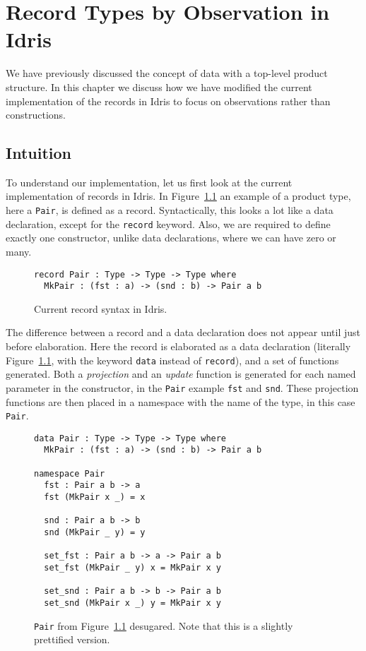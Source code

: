 \chapter{Record Types by Observation in Idris}
\label{cha:coind-records-idris}
We have previously discussed the concept of data with a top-level product
structure. In this chapter we discuss how we have modified the current
implementation of the records in Idris to focus on observations rather
than constructions.

\section{Intuition}
To understand our implementation, let us first look at the current
implementation of records in Idris. In Figure~\ref{fig:records_in_idris} an
example of a product type, here a \texttt{Pair}, is defined as a
record. Syntactically, this looks a lot like a data declaration, except for the
\texttt{record} keyword. Also, we are required to define exactly one
constructor, unlike data declarations, where we can have zero or many.

\begin{figure}[h]
\begin{lstlisting}
record Pair : Type -> Type -> Type where
  MkPair : (fst : a) -> (snd : b) -> Pair a b
\end{lstlisting}
  \caption{Current record syntax in Idris.}
  \label{fig:records_in_idris}
\end{figure}

The difference between a record and a data declaration does not appear until just
before elaboration. Here the record is elaborated as a data declaration
(literally Figure~\ref{fig:records_in_idris}, with the keyword \texttt{data}
instead of \texttt{record}), and a set of functions generated. Both a
\emph{projection} and an \emph{update} function is generated for each named
parameter in the constructor, in the \texttt{Pair} example \texttt{fst} and
\texttt{snd}. These projection functions are then placed in a namespace with the
name of the type, in this case \texttt{Pair}. 

\begin{figure}[h]
\begin{lstlisting}
data Pair : Type -> Type -> Type where
  MkPair : (fst : a) -> (snd : b) -> Pair a b

namespace Pair
  fst : Pair a b -> a
  fst (MkPair x _) = x

  snd : Pair a b -> b
  snd (MkPair _ y) = y

  set_fst : Pair a b -> a -> Pair a b
  set_fst (MkPair _ y) x = MkPair x y

  set_snd : Pair a b -> b -> Pair a b
  set_snd (MkPair x _) y = MkPair x y
\end{lstlisting}
  \caption{\texttt{Pair} from Figure~\ref{fig:records_in_idris} desugared. Note
    that this is a slightly prettified version.}
  \label{fig:pair_desugared}
\end{figure}

